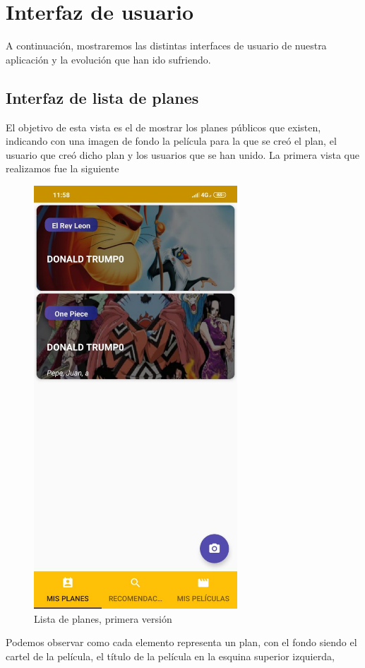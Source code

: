\section{Interfaz de usuario}
\label{makereference3.4}

A continuación, mostraremos las distintas interfaces de usuario de nuestra aplicación y la evolución que han ido sufriendo.
\subsection{Interfaz de lista de planes}
\label{makereference3.4.1}
El objetivo de esta vista es el de mostrar los planes públicos que existen, indicando con una imagen de fondo la película para la que se creó el plan, el usuario
que creó dicho plan y los usuarios que se han unido. La primera vista que realizamos fue la siguiente
\begin{figure}[H]
    \centering
    \includegraphics[width=3in]{figures/PlansList1.jpg}
    \caption{Lista de planes, primera versión}
\end{figure}
Podemos observar como cada elemento representa un plan, con el fondo siendo el cartel de la película, el título de la película en la esquina superior izquierda,
